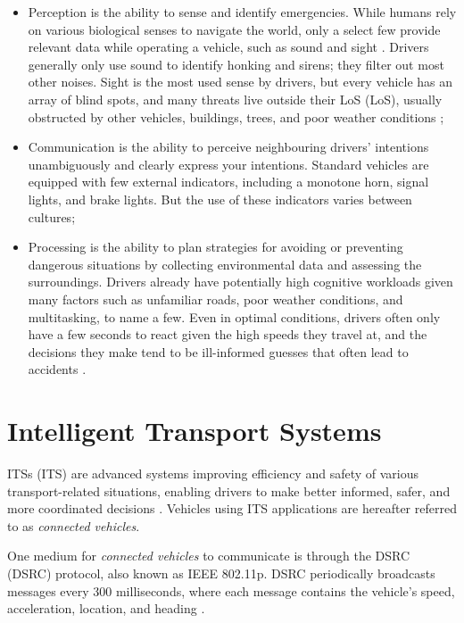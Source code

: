 \begin{itemize}
	\item Perception is the ability to sense and identify emergencies. While humans rely on various biological senses to navigate the world, only a select few provide relevant data while operating a vehicle, such as sound and sight \cite{Sukru2020}. Drivers generally only use sound to identify honking and sirens; they filter out most other noises. Sight is the most used sense by drivers, but every vehicle has an array of blind spots, and many threats live outside their \acrlong{LoS} (\acrshort{LoS}), usually obstructed by other vehicles, buildings, trees, and poor weather conditions \cite{Sukru2020};
	
	\item Communication is the ability to perceive neighbouring drivers' intentions unambiguously and clearly express your intentions. Standard vehicles are equipped with few external indicators, including a monotone horn, signal lights, and brake lights. But the use of these indicators varies between cultures;
	
	\item Processing is the ability to plan strategies for avoiding or preventing dangerous situations by collecting environmental data and assessing the surroundings. Drivers already have potentially high cognitive workloads given many factors such as unfamiliar roads, poor weather conditions, and multitasking, to name a few. Even in optimal conditions, drivers often only have a few seconds to react given the high speeds they travel at, and the decisions they make tend to be ill-informed guesses that often lead to accidents \cite{Buchenscheit2009}.
\end{itemize}


\section{Intelligent Transport Systems}

\acrlong{ITS}s (\acrshort{ITS}) are advanced systems improving efficiency and safety of various transport-related situations, enabling drivers to make better informed, safer, and more coordinated decisions \cite{Huang2009, Khare2020, Beneoks2019, Drop2021}. Vehicles using \acrshort{ITS} applications are hereafter referred to as \textit{connected vehicles}.

One medium for \textit{connected vehicles} to communicate is through the \acrlong{DSRC} (\acrshort{DSRC}) protocol, also known as IEEE 802.11p. \acrshort{DSRC} periodically broadcasts messages every 300 milliseconds, where each message contains the vehicle's speed, acceleration, location, and heading \cite{Hafeez2013, Khare2020}.

